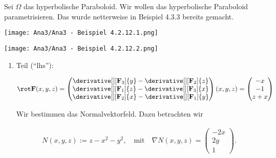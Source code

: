 \begin{solution}

\phantom{}


Sei $\Omega$ das hyperbolische Paraboloid.
Wir wollen das hyperbolische Paraboloid parametrisieren.
Das wurde netterweise in Beispiel 4.3.3 bereits gemacht.

\begin{tcolorbox}[standard jigsaw, opacityback = 0]
    \begin{center}
        \texttt{[image: Ana3/Ana3 - Beispiel 4.2.12.1.png]}        
    \end{center}
    \hspace{1.85cm}
    \texttt{[image: Ana3/Ana3 - Beispiel 4.2.12.2.png]}
\end{tcolorbox}

\begin{enumerate}[label = \arabic*.]

    \item Teil (\enquote{lhs}):
    
    \begin{align*}
        \rot \mathbf F(x, y, z)
        =
        \begin{pmatrix}
            \derivative[][\mathbf F_3]{y}
            -
            \derivative[][\mathbf F_2]{z} \\
            \derivative[][\mathbf F_1]{z}
            -
            \derivative[][\mathbf F_3]{x} \\
            \derivative[][\mathbf F_2]{x}
            -
            \derivative[][\mathbf F_1]{y}
        \end{pmatrix}
        (x, y, z)
        =
        \begin{pmatrix}
            -x \\ -1 \\ z + x
        \end{pmatrix}
    \end{align*}

    Wir bestimmen das Normalvektorfeld.
    Dazu betrachten wir
    
    \begin{align*}
        N(x, y, z) := z - x^2 - y^2,
        \quad
        \text{mit}
        \quad
        \nabla N(x, y, z)
        =
        \begin{pmatrix}
            -2 x \\ 2 y \\ 1
        \end{pmatrix}.
    \end{align*}
    

\end{enumerate}
\end{solution}
